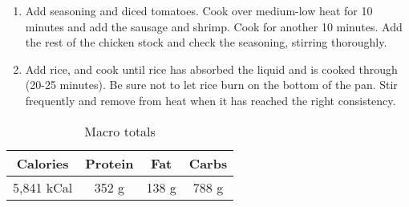 \begin{multicols}{2}
\begin{enumerate}
\item Add seasoning and diced tomatoes. Cook over medium-low heat for 10 minutes and add the sausage and shrimp. Cook for another 10 minutes. Add the rest of the chicken stock and check the seasoning, stirring thoroughly. 
\newline 

 \item Add rice, and cook until rice has absorbed the liquid and is cooked through (20-25 minutes). Be sure not to let rice burn on the bottom of the pan. Stir frequently and remove from heat when it has reached the right consistency. 
\end{enumerate}

\begin{table}[H]
  \begin{center}
    \caption{Macro totals}
    \label{tab:table1}
    \begin{tabular}{c|c|c|c} %
      \textbf{Calories} & \textbf{Protein} & \textbf{Fat} & \textbf{Carbs}\\
      \hline
      5,841 kCal & 352 g & 138 g & 788 g\\
    \end{tabular}
  \end{center}
\end{table}
\end{multicols}


